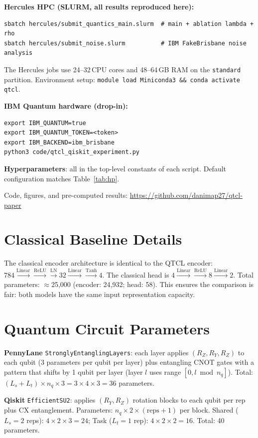 \documentclass[a4paper,nopdfoutputerror]{quantumarticle}
\begin{document}
\noindent\textbf{Hercules HPC (SLURM, all results reproduced here):}
\begin{verbatim}
sbatch hercules/submit_quantics_main.slurm  # main + ablation lambda + rho
sbatch hercules/submit_noise.slurm          # IBM FakeBrisbane noise analysis
\end{verbatim}
The Hercules jobs use 24--32\,CPU cores and 48--64\,GB RAM on the
\texttt{standard} partition.
Environment setup: \texttt{module load Miniconda3 \&\& conda activate qtcl}.

\noindent\textbf{IBM Quantum hardware (drop-in):}
\begin{verbatim}
export IBM_QUANTUM=true
export IBM_QUANTUM_TOKEN=<token>
export IBM_BACKEND=ibm_brisbane
python3 code/qtcl_qiskit_experiment.py
\end{verbatim}

\noindent\textbf{Hyperparameters}: all in the top-level constants of each
script. Default configuration matches Table~\ref{tab:hp}.

\noindent Code, figures, and pre-computed results:
\url{https://github.com/danimap27/qtcl-paper}

\section{Classical Baseline Details}
\label{app:classical}

The classical encoder architecture is identical to the QTCL encoder:
$784\xrightarrow{\text{Linear}}\xrightarrow{\text{ReLU}}\xrightarrow{\text{LN}}32
\xrightarrow{\text{Linear}}\xrightarrow{\text{Tanh}}4$.
The classical head is $4\xrightarrow{\text{Linear}}\xrightarrow{\text{ReLU}}
8\xrightarrow{\text{Linear}}2$.
Total parameters: $\approx$25{,}000 (encoder: 24{,}932; head: 58).
This ensures the comparison is fair: both models have the same input
representation capacity.

\section{Quantum Circuit Parameters}
\label{app:circuits}

\textbf{PennyLane} \texttt{StronglyEntanglingLayers}:
each layer applies $(R_Z, R_Y, R_Z)$ to each qubit (3 parameters per qubit
per layer) plus entangling CNOT gates with a pattern that shifts by 1 qubit
per layer (layer $l$ uses range $[0,l\bmod n_q]$).
Total: $(L_s+L_t)\times n_q \times 3 = 3\times4\times3=36$ parameters.

\textbf{Qiskit} \texttt{EfficientSU2}:
applies $(R_Y, R_Z)$ rotation blocks to each qubit per rep plus CX entanglement.
Parameters: $n_q\times2\times(\text{reps}+1)$ per block.
Shared ($L_s=2$ reps): $4\times2\times3=24$; Task ($L_t=1$ rep): $4\times2\times2=16$.
Total: 40 parameters.
\end{document}
